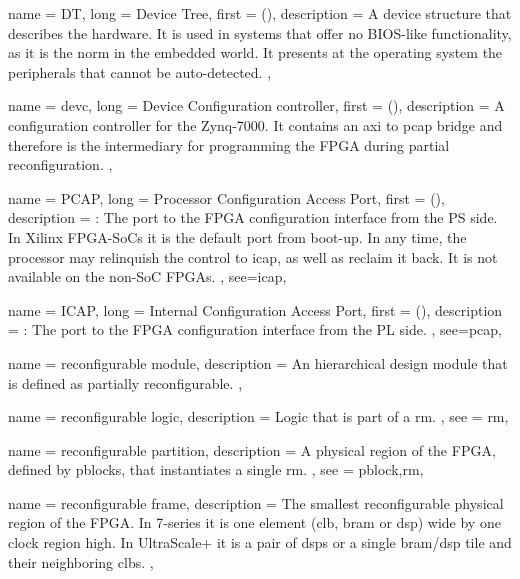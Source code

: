{
	name = {DT},
	long = {Device Tree},
	first = { ()},
	description = {
		A device structure that describes the hardware.
		It is used in systems that offer no BIOS-like functionality,
		as it is the norm in the embedded world. It presents 
		at the operating system the peripherals that cannot be auto-detected.
	},
}

{
	name = {devc},
	long = {Device Configuration controller},
	first = { ()},
	description = {
		A configuration controller for the Zynq-7000.
		It contains an \gls{axi} to \gls{pcap} bridge
		and therefore is the intermediary
		for programming the FPGA during partial reconfiguration.
	},
}

{
	name = {PCAP},
	long = {Processor Configuration Access Port},
	first = { ()},
	description = {\emph{}:
		The port to the FPGA configuration interface from the PS side.
		In Xilinx FPGA-SoCs it is the default port from boot-up.
		In any time, the processor may relinquish the control to \gls{icap},
		as well as reclaim it back. It is not available on the non-SoC FPGAs.
	},
	see={icap},
}


{
	name = {ICAP},
	long = {Internal Configuration Access Port},
	first = { ()},
	description = {\emph{}:
		The port to the FPGA configuration interface from the PL side.
	},
	see={pcap},
}


{
	name = {reconfigurable module},
	description = {
		An hierarchical design module that is defined as partially reconfigurable.
	},
}


{
	name = {reconfigurable logic},
	description = {
		Logic that is part of a \gls{rm}.
	},
	see = {rm},
}


{
	name = {reconfigurable partition},
	description = {
		A physical region of the FPGA, defined by \glspl{pblock},
		that instantiates a single \gls{rm}.
	},
	see = {pblock,rm},
}

{
	name = {reconfigurable frame},
	description = {
		The smallest reconfigurable physical region of the FPGA. 
		In 7-series it is one element (\gls{clb}, \gls{bram} or \gls{dsp}) wide by one clock region high.
		In UltraScale+ it is a pair of \glspl{dsp} or a single \gls{bram}/\gls{dsp} 
		tile and their neighboring \glspl{clb}.
	},
}


